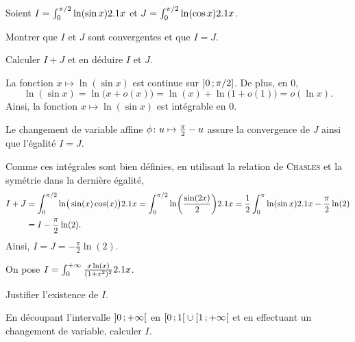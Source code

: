 
\begin{exercice}
    Soient $I = \int_0^{\pi/2} \ln(\sin x) \d x$ et $J = \int_0^{\pi/2} \ln(\cos x) \d x$.
    \begin{questions}
        \item Montrer que $I$ et $J$ sont convergentes et que $I = J$.
        \item Calculer $I + J$ et en déduire $I$ et $J$.
    \end{questions}
\end{exercice}


\begin{elemsolution}
\begin{reponses}
\item La fonction $x \mapsto \ln(\sin x)$ est continue sur $\interof{0}{\pi/2}$. De plus, en $0$,
\[
\ln(\sin x) = \ln\mathopen{}\big(x + o(x)\big) = \ln(x) + \ln\mathopen{}\big(1 + o(1)\big) = o(\ln x).
\]
Ainsi, la fonction $x \mapsto \ln(\sin x)$ est intégrable en $0$.

Le changement de variable affine $\fonctionligne[\phi]{u}{\frac{\pi}{2} - u}$ assure la convergence de $J$ ainsi que l'égalité $I = J$.

\item Comme ces intégrales sont bien définies, en utilisant la relation de \textsc{Chasles} et la symétrie dans la dernière égalité,
\begin{align*}
I + J &= \int_0^{\pi/2} \ln\mathopen{}\big( \sin(x) \cos(x) \big) \d x = \int_0^{\pi/2} \ln(\frac{\sin(2x)}{2}) \d x = \frac{1}{2} \int_0^\pi \ln(\sin x) \d x - \frac{\pi}{2} \ln(2) \\
&= I - \frac{\pi}{2} \ln(2).
\end{align*}
Ainsi, $I = J = -\frac{\pi}{2} \ln(2)$.
\end{reponses}
\end{elemsolution}

\begin{exercice}
On pose $I = \int_0^{+\infty} \frac{x \ln(x)}{(1 + x^2)^2} \d x$.
\begin{questions}
\item Justifier l'existence de $I$.

\item En découpant l'intervalle $\interoo{0}{+\infty}$ en $\interfo{0}{1} \cup \interfo{1}{+\infty}$ et en effectuant un changement de variable, calculer $I$.
\end{questions}
\end{exercice}

